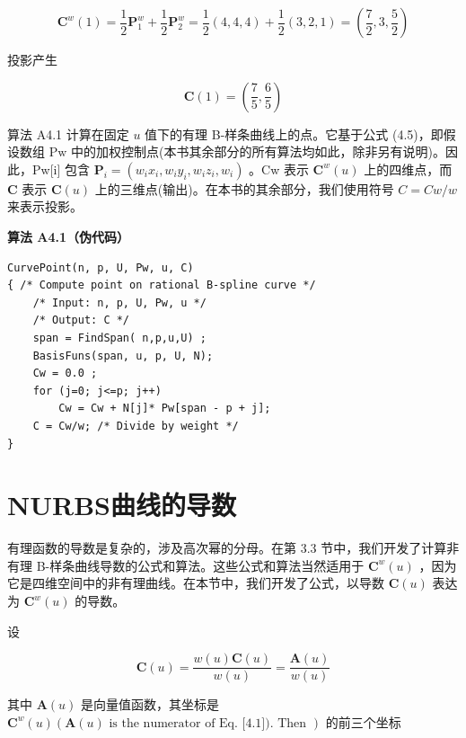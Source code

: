 \documentclass[../main.tex]{subfiles}
\begin{document}
\[
{\mathbf{C}}^{w}\left( 1\right)  = \frac{1}{2}{\mathbf{P}}_{1}^{w} + \frac{1}{2}{\mathbf{P}}_{2}^{w} = \frac{1}{2}\left( {4,4,4}\right)  + \frac{1}{2}\left( {3,2,1}\right)  = \left( {\frac{7}{2},3,\frac{5}{2}}\right)
\]




投影产生

\[
\mathbf{C}\left( 1\right)  = \left( {\frac{7}{5},\frac{6}{5}}\right)
\]

算法 A4.1 计算在固定 \(u\) 值下的有理 B-样条曲线上的点。它基于公式 (4.5)，即假设数组 \(\mathrm{{Pw}}\) 中的加权控制点(本书其余部分的所有算法均如此，除非另有说明)。因此，Pw[i] 包含 \({\mathbf{P}}_{i} = \left( {{w}_{i}{x}_{i},{w}_{i}{y}_{i},{w}_{i}{z}_{i},{w}_{i}}\right)\) 。Cw 表示 \({\mathbf{C}}^{w}\left( u\right)\) 上的四维点，而 \(\mathbf{C}\) 表示 \(\mathbf{C}\left( u\right)\) 上的三维点(输出)。在本书的其余部分，我们使用符号 \(C = {Cw}/w\) 来表示投影。

\par\medskip\noindent\textbf{算法 A4.1（伪代码）}\par
\begin{verbatim}
CurvePoint(n, p, U, Pw, u, C)
{ /* Compute point on rational B-spline curve */
    /* Input: n, p, U, Pw, u */
    /* Output: C */
    span = FindSpan( n,p,u,U) ;
    BasisFuns(span, u, p, U, N);
    Cw = 0.0 ;
    for (j=0; j<=p; j++)
        Cw = Cw + N[j]* Pw[span - p + j];
    C = Cw/w; /* Divide by weight */
}
\end{verbatim}



\section{NURBS曲线的导数}

有理函数的导数是复杂的，涉及高次幂的分母。在第 3.3 节中，我们开发了计算非有理 B-样条曲线导数的公式和算法。这些公式和算法当然适用于 \({\mathbf{C}}^{w}\left( u\right)\) ，因为它是四维空间中的非有理曲线。在本节中，我们开发了公式，以导数 \(\mathbf{C}\left( u\right)\) 表达为 \({\mathbf{C}}^{w}\left( u\right)\) 的导数。

设

\[
\mathbf{C}\left( u\right)  = \frac{w\left( u\right) \mathbf{C}\left( u\right) }{w\left( u\right) } = \frac{\mathbf{A}\left( u\right) }{w\left( u\right) }
\]

其中 \(\mathbf{A}\left( u\right)\) 是向量值函数，其坐标是 \({\mathbf{C}}^{w}\left( u\right) \left( {\mathbf{A}\left( u\right) \text{ is the numerator of Eq. [4.1]). Then }}\right)\) 的前三个坐标
\end{document}
